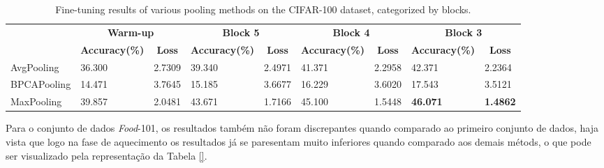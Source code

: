 \begin{table}[htbp]
    \caption{Fine-tuning results of various pooling methods on the CIFAR-100 dataset, categorized by blocks.}
    \label{tab:cifar_finetuning}
    \centering
    \begin{tabular}{lllllllll}
    \firsthline
    \multicolumn{1}{c}{\textbf{Pooling Methods}} & \multicolumn{2}{c}{\textbf{Warm-up}}                                          & \multicolumn{2}{c}{\textbf{Block 5}}                                          & \multicolumn{2}{c}{\textbf{Block 4}}                                          & \multicolumn{2}{c}{\textbf{Block 3}}                                          \\
    \cline{2-9}
    \multicolumn{1}{c}{\textbf{}}                & \multicolumn{1}{c}{\textbf{Accuracy(\%)}} & \multicolumn{1}{c}{\textbf{Loss}} & \multicolumn{1}{c}{\textbf{Accuracy(\%)}} & \multicolumn{1}{c}{\textbf{Loss}} & \multicolumn{1}{c}{\textbf{Accuracy(\%)}} & \multicolumn{1}{c}{\textbf{Loss}} & \multicolumn{1}{c}{\textbf{Accuracy(\%)}} & \multicolumn{1}{c}{\textbf{Loss}} \\
    \hline
    AvgPooling                                   &                                    36.300 &                            2.7309 &                                    39.340 &                            2.4971 &                                    41.371 &                            2.2958 &                                    42.371 &                            2.2364 \\
    BPCAPooling                                  &                                    14.471 &                            3.7645 &                                    15.185 &                            3.6677 &                                    16.229 &                            3.6020 &                                    17.543 &                            3.5121 \\
    MaxPooling                                   &                                    39.857 &                            2.0481 &                                    43.671 &                            1.7166 &                                    45.100 &                            1.5448 &                                    \textbf{46.071} &                            \textbf{1.4862} 
    \end{tabular}
\end{table}

Para o conjunto de dados \textit{Food}-101, os resultados também não foram discrepantes quando comparado ao primeiro conjunto de dados, haja vista que logo na fase de aquecimento os resultados já se paresentam muito inferiores quando comparado aos demais métods, o que pode ser visualizado pela representação da Tabela \ref{}.

